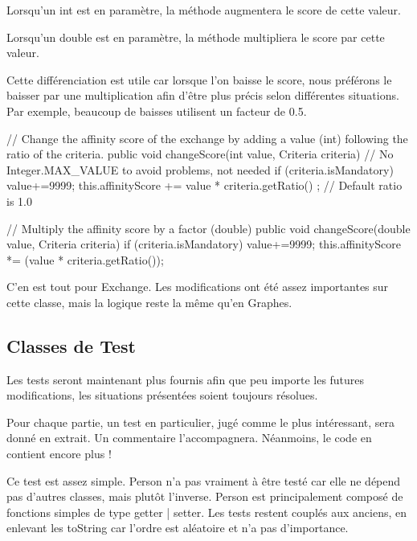 \documentclass{mytex}
\begin{document}
Lorsqu'un int est en paramètre, la méthode augmentera le score de cette valeur.

Lorsqu'un double est en paramètre, la méthode multipliera le score par cette valeur.

Cette différenciation est utile car lorsque l'on baisse le score, nous préférons le baisser par une multiplication afin d'être plus précis selon différentes situations. Par exemple, beaucoup de baisses utilisent un facteur de 0.5.

\begin{codebox}
// Change the affinity score of the exchange by adding a value (int) following the ratio of the criteria.
public void changeScore(int value, Criteria criteria) {
	// No Integer.MAX_VALUE to avoid problems, not needed
	if (criteria.isMandatory) value+=9999;
	this.affinityScore += value * criteria.getRatio() ; // Default ratio is 1.0 
}

// Multiply the affinity score by a factor (double)
public void changeScore(double value, Criteria criteria) {
	if (criteria.isMandatory) value+=9999;
	this.affinityScore *= (value * criteria.getRatio());
}
\end{codebox}

C'en est tout pour Exchange. Les modifications ont été assez importantes sur cette classe, mais la logique reste la même qu'en Graphes.

\subsection{Classes de Test}

Les tests seront maintenant plus fournis afin que peu importe les futures modifications, les situations présentées soient toujours résolues.

Pour chaque partie, un test en particulier, jugé comme le plus intéressant, sera donné en extrait. Un commentaire l'accompagnera. Néanmoins, le code en contient encore plus !


Ce test est assez simple. Person n'a pas vraiment à être testé car elle ne dépend pas d'autres classes, mais plutôt l'inverse. Person est principalement composé de fonctions simples de type getter | setter. Les tests restent couplés aux anciens, en enlevant les toString car l'ordre est aléatoire et n'a pas d'importance.
\end{document}
